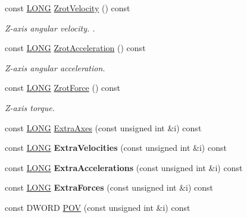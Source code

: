 \begin{DoxyCompactItemize}
\item 
\mbox{\label{class_c_joypad_aeac29a2532b14f32b80083732f4e16fc}} 
const \hyperlink{_joypad_8h_a2a3e0cda5f1249bef6db47c5eb8e3813}{L\+O\+NG} \hyperlink{class_c_joypad_aeac29a2532b14f32b80083732f4e16fc}{Zrot\+Velocity} () const
\begin{DoxyCompactList}\small\item\em Z-\/axis angular velocity. . \end{DoxyCompactList}\item 
\mbox{\label{class_c_joypad_aabd6bdcfe5e14fe36cc8a18695a5f526}} 
const \hyperlink{_joypad_8h_a2a3e0cda5f1249bef6db47c5eb8e3813}{L\+O\+NG} \hyperlink{class_c_joypad_aabd6bdcfe5e14fe36cc8a18695a5f526}{Zrot\+Acceleration} () const
\begin{DoxyCompactList}\small\item\em Z-\/axis angular acceleration. \end{DoxyCompactList}\item 
\mbox{\label{class_c_joypad_a48fe142d3b2733689c143564ffbcf16a}} 
const \hyperlink{_joypad_8h_a2a3e0cda5f1249bef6db47c5eb8e3813}{L\+O\+NG} \hyperlink{class_c_joypad_a48fe142d3b2733689c143564ffbcf16a}{Zrot\+Force} () const
\begin{DoxyCompactList}\small\item\em Z-\/axis torque. \end{DoxyCompactList}\item 
const \hyperlink{_joypad_8h_a2a3e0cda5f1249bef6db47c5eb8e3813}{L\+O\+NG} \hyperlink{class_c_joypad_ac94bd5a534d97f4c82456397e9a01b1c}{Extra\+Axes} (const unsigned int \&i) const
\item 
\mbox{\label{class_c_joypad_a352f2fd69c862c564b2750474b6911ee}} 
const \hyperlink{_joypad_8h_a2a3e0cda5f1249bef6db47c5eb8e3813}{L\+O\+NG} {\bfseries Extra\+Velocities} (const unsigned int \&i) const
\item 
\mbox{\label{class_c_joypad_aa1770ea6ba770073c43b6b8169aabbba}} 
const \hyperlink{_joypad_8h_a2a3e0cda5f1249bef6db47c5eb8e3813}{L\+O\+NG} {\bfseries Extra\+Accelerations} (const unsigned int \&i) const
\item 
\mbox{\label{class_c_joypad_a705e7a4f1084c37843b23c9d59addcd9}} 
const \hyperlink{_joypad_8h_a2a3e0cda5f1249bef6db47c5eb8e3813}{L\+O\+NG} {\bfseries Extra\+Forces} (const unsigned int \&i) const
\item 
const D\+W\+O\+RD \hyperlink{class_c_joypad_a52dad2bae4ae8ef1574d963bdd4c1a5d}{P\+OV} (const unsigned int \&i) const
\end{DoxyCompactItemize}
